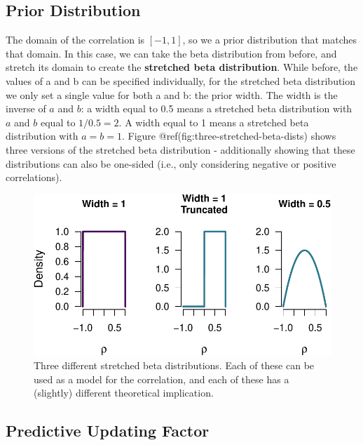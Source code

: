 \documentclass[
  letterpaper,
  DIV=11,
  numbers=noendperiod]{scrreprt}
\begin{document}
\hypertarget{prior-distribution-1}{%
\subsection{Prior Distribution}\label{prior-distribution-1}}

The domain of the correlation is \([-1, 1]\), so we a prior distribution
that matches that domain. In this case, we can take the beta
distribution from before, and stretch its domain to create the
\textbf{stretched beta distribution}. While before, the values of a and
b can be specified individually, for the stretched beta distribution we
only set a single value for both a and b: the prior width. The width is
the inverse of \(a\) and \(b\): a width equal to 0.5 means a stretched
beta distribution with \(a\) and \(b\) equal to \(1 / 0.5 = 2\). A width
equal to 1 means a stretched beta distribution with \(a = b = 1\).
Figure @ref(fig:three-stretched-beta-dists) shows three versions of the
stretched beta distribution - additionally showing that these
distributions can also be one-sided (i.e., only considering negative or
positive correlations).

\begin{figure}

{\centering \includegraphics[width=1\textwidth,height=\textheight]{05-more-tests_files/figure-pdf/three-stretched-beta-dists-1.pdf}

}

\caption{Three different stretched beta distributions. Each of these can
be used as a model for the correlation, and each of these has a
(slightly) different theoretical implication.}

\end{figure}

\hypertarget{predictive-updating-factor-1}{%
\subsection{Predictive Updating
Factor}\label{predictive-updating-factor-1}}
\end{document}

